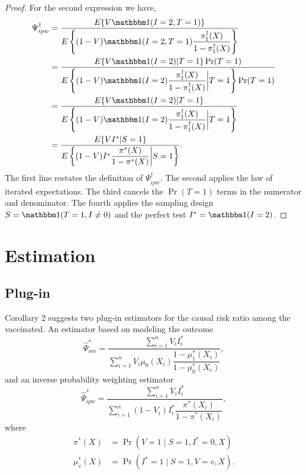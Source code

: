 \documentclass{article}
\begin{document}
\begin{proof}
For the second expression we have,
\begin{align*}
    \Psi^\dagger_{ipw} &= \dfrac{E\{V \mathbbm 1 (I = 2, T = 1)\}}{E\left\{ (1 - V) \mathbbm 1(I = 2, T = 1) \dfrac{\pi^\dagger_1(X)}{1 - \pi^\dagger_1(X)}\right\}} \\
    &= \dfrac{E\{V \mathbbm 1 (I = 2) | T = 1\} \Pr(T = 1)}{E\left\{ (1 - V) \mathbbm 1(I = 2) \dfrac{\pi^\dagger_1(X)}{1 - \pi^\dagger_1(X)} \bigg| T = 1\right\} \Pr(T = 1)} \\
    &= \dfrac{E\{V \mathbbm 1 (I = 2) | T = 1\}}{E\left\{ (1 - V) \mathbbm 1(I = 2) \dfrac{\pi^\dagger_1(X)}{1 - \pi^\dagger_1(X)} \bigg| T = 1\right\}} \\
    &= \dfrac{E\{VI^*|S =1\}}{E\left\{ (1 - V) I^* \dfrac{\pi^*(X)}{1 - \pi^*(X)} \bigg| S = 1\right\}}.
\end{align*}
The first line restates the definition of $\Psi^\dagger_{ipw}$. The second applies the law of iterated expectations. The third cancels the $\Pr(T = 1)$ terms in the numerator and denominator. The fourth applies the sampling design $S = \mathbbm 1 (T = 1, I \neq 0)$ and the perfect test $I^* = \mathbbm 1(I = 2)$.

\end{proof}
\newpage
\section{Estimation}
\subsection{Plug-in}
Corollary 2 suggests two plug-in estimators for the causal risk ratio among the vaccinated.  An estimator based on modeling the outcome
\begin{equation}
    \widehat{\Psi}_{om}^* = \dfrac{\sum_{i=1}^n V_i I^*_i}{\sum_{i=1}^n V_i \mu_0(X_i)\dfrac{1 - \mu^*_1(X_i)}{1 - \mu^*_0(X_i)}},
\end{equation}
and an inverse probability weighting estimator
\begin{equation}
    \widehat{\Psi}_{ipw}^* = \dfrac{\sum_{i=1}^n V_i I^*_i}{\sum_{i=1}^n (1 - V_i) I^*_i \dfrac{\pi^*(X_i)}{1 - \pi^*(X_i)}},
\end{equation}
where 
\begin{align*}
    \pi^*(X) &= \Pr(V=1\mid S=1, I^*=0, X) \\
    \mu^*_v(X) &= \Pr(I^*=1\mid S=1, V=v, X).
\end{align*}
\end{document}
